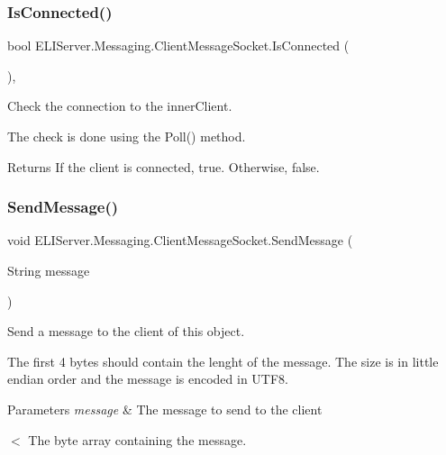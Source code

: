 \subsubsection{\texorpdfstring{Is\+Connected()}{IsConnected()}}
{\footnotesize\ttfamily bool E\+L\+I\+Server.\+Messaging.\+Client\+Message\+Socket.\+Is\+Connected (\begin{DoxyParamCaption}{ }\end{DoxyParamCaption})\hspace{0.3cm}{\ttfamily [inline]}, {\ttfamily [package]}}





Check the connection to the inner\+Client.

The check is done using the Poll() method. 

\begin{DoxyReturn}{Returns}
If the client is connected, true. Otherwise, false.
\end{DoxyReturn}
\mbox{\label{class_e_l_i_server_1_1_messaging_1_1_client_message_socket_a0b1b4e6b86d3724706b8abf34a7a061c}} 
\subsubsection{\texorpdfstring{Send\+Message()}{SendMessage()}}
{\footnotesize\ttfamily void E\+L\+I\+Server.\+Messaging.\+Client\+Message\+Socket.\+Send\+Message (\begin{DoxyParamCaption}\item[{String}]{message }\end{DoxyParamCaption})\hspace{0.3cm}{\ttfamily [inline]}}





Send a message to the client of this object.

The first 4 bytes should contain the lenght of the message. The size is in little endian order and the message is encoded in U\+T\+F8. 


\begin{DoxyParams}{Parameters}
{\em message} & The message to send to the client\\
\hline
\end{DoxyParams}
$<$ The byte array containing the message. 

